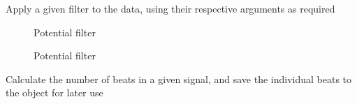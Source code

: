 \documentclass[letterpaper,10pt,english]{sphinxmanual}
\begin{document}
\begin{fulllineitems}
\begin{fulllineitems}
\label{\detokenize{_autosummary/signalanalysis.ecg.Ecg:signalanalysis.ecg.Ecg.apply_filter}}
\sphinxAtStartPar
Apply a given filter to the data, using their respective arguments as required


\nopagebreak

\begin{description}
\item[{{\hyperref[\detokenize{_autosummary/tools.maths.filter_butterworth:tools.maths.filter_butterworth}]{}}}] \leavevmode
\sphinxAtStartPar
Potential filter

\item[{{\hyperref[\detokenize{_autosummary/tools.maths.filter_savitzkygolay:tools.maths.filter_savitzkygolay}]{}}}] \leavevmode
\sphinxAtStartPar
Potential filter

\end{description}



\end{fulllineitems}


\begin{fulllineitems}
\label{\detokenize{_autosummary/signalanalysis.ecg.Ecg:id0}}
\sphinxAtStartPar
Calculate the number of beats in a given signal, and save the individual beats to the object for later use


\end{fulllineitems}
\end{fulllineitems}
\end{document}
